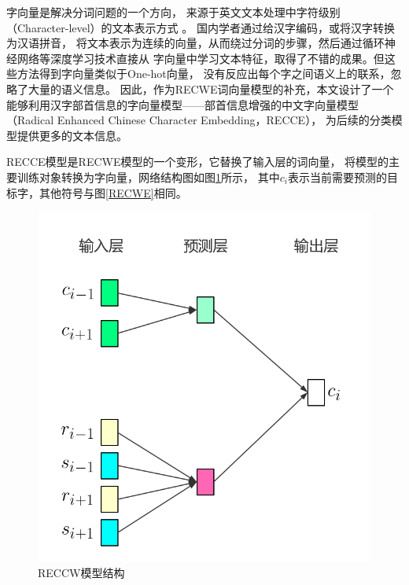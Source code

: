字向量是解决分词问题的一个方向，
来源于英文文本处理中字符级别（Character-level）的文本表示方式
。
国内学者通过给汉字编码，或将汉字转换为汉语拼音，
将文本表示为连续的向量，从而绕过分词的步骤，然后通过循环神经网络等深度学习技术直接从
字向量中学习文本特征，取得了不错的成果。但这些方法得到字向量类似于One-hot向量，
没有反应出每个字之间语义上的联系，忽略了大量的语义信息。
因此，作为RECWE词向量模型的补充，本文设计了一个能够利用汉字部首信息的字向量模型——部首信息增强的中文字向量模型（Radical Enhanced Chinese Character Embedding，RECCE），
为后续的分类模型提供更多的文本信息。

RECCE模型是RECWE模型的一个变形，它替换了输入层的词向量，
将模型的主要训练对象转换为字向量，网络结构图如图\ref{RECCE}所示，
其中$c_i$表示当前需要预测的目标字，其他符号与图\ref{RECWE}相同。
\begin{figure}
    \includegraphics[scale=0.4]{picture/RECCE.png}
    \caption{RECCW模型结构}
    \label{RECCE}
\end{figure}

